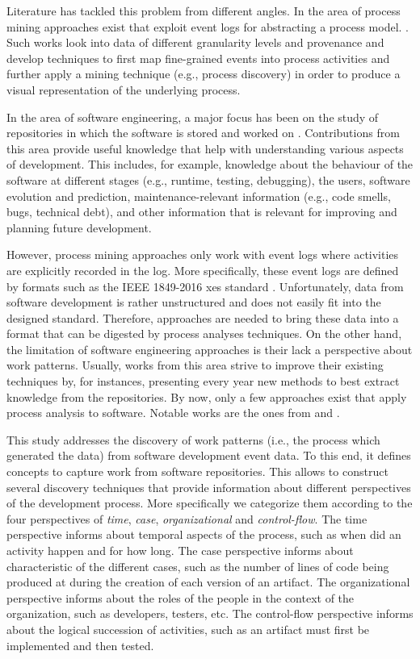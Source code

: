 Literature has tackled this problem from different angles. In the area of process mining approaches exist that exploit event logs for abstracting a process model.  \citep{Zerbino2021,vanZelst2021,DBLP:journals/tkde/AugustoCDRMMMS19,Rojas2016}. 
Such works look into data of different granularity levels and provenance and develop techniques to first map fine-grained events into process activities and further apply a mining technique (e.g., process discovery) in order to produce a visual representation of the underlying process. 

In the area of software engineering, a major focus has been on the study of repositories in which the software is stored and worked on \citep{Farias2016,Matthies2020,Barros2021}. Contributions from this area provide useful knowledge that help with understanding various aspects of development. This includes, for example, knowledge about the behaviour of the software at different stages (e.g., runtime, testing, debugging), the users, software evolution and prediction, maintenance-relevant information (e.g., code smells, bugs, technical debt), and other information that is relevant for improving and planning future development.

However, process mining approaches only work with event logs where activities are explicitly recorded in the log. More specifically, these event logs are defined by formats such as the IEEE 1849-2016 \gls{xes} standard \citep{xes-standard:2015}.
Unfortunately, data from software development is rather unstructured and does not easily fit into the designed standard. Therefore, approaches are needed to bring these data into a format that can be digested by process analyses techniques. 
On the other hand, the limitation of software engineering approaches is their lack a perspective about work patterns. Usually, works from this area strive to improve their existing techniques by, for instances, presenting every year new methods to best extract knowledge from the repositories. By now, only a few approaches exist that apply process analysis to software. Notable works are the ones from \citet{DBLP:conf/csmr/PoncinSB11} and \citet{Mittal2014}.


This study addresses the discovery of work patterns (i.e., the process which generated the data) from software development event data. To this end, it defines concepts to capture work from software repositories. This allows to construct several discovery techniques that provide information about different perspectives of the development process. More specifically we categorize them according to the four perspectives \citep{DBLP:books/sp/Aalst16} of \emph{time}, \emph{case}, \emph{organizational} and \emph{control-flow}. The time perspective informs about temporal aspects of the process, such as when did an activity happen and for how long. The case perspective informs about characteristic of the different cases, such as the number of lines of code being produced at during the creation of each version of an artifact. The organizational perspective informs about the roles of the people in the context of the organization, such as developers, testers, etc. The control-flow perspective informs about the logical succession of activities, such as an artifact must first be implemented and then tested. 

